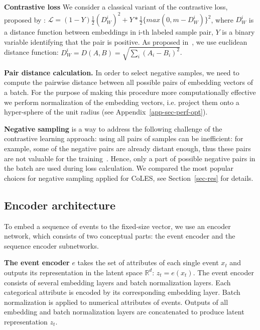 \documentclass[sigconf]{acmart}
\newcommand{\R}{\mathbb{R}}
\begin{document}
\textbf{Contrastive loss} We consider a classical variant of the contrastive loss, proposed by \citep{Hadsell2006DimensionalityRB}: %
$ \mathcal{L} =  (1-Y)\frac{1}{2}(D_W^i)^2 +Y*\frac{1}{2}\{max(0,m-D_W^i)\}^2 $, where $D_W^i$ is a distance function between embeddings in i-th labeled sample pair, $Y$ is a binary variable identifying that the pair is positive.
As proposed in~\citep{Hadsell2006DimensionalityRB}, we use euclidean distance function: $D_W^i = D(A,B) = \sqrt{\sum_i(A_i - B_i)^2}$.

\textbf{Pair distance calculation.} In order to select negative samples, we need to compute the pairwise distance between all possible pairs of embedding vectors of a batch. For the purpose of making this procedure more computationally effective we perform normalization of the embedding vectors, i.e. project them onto a hyper-sphere of the unit radius (see Appendix~\ref{app-sec-perf-opt}).


\textbf{Negative sampling} is a way to address the following challenge of the contrastive learning approach: using all pairs of samples can be inefficient: for example, some of the negative pairs are already distant enough, thus these pairs are not valuable for the training~\citep{SimoSerra2015DiscriminativeLO, Schroff2015FaceNetAU}. Hence, only a part of possible negative pairs in the batch are used during loss calculation. We compared the most popular choices for negative sampling applied for CoLES, see Section~\ref{sec-res} for details.

\subsection{Encoder architecture} \label{sec-enc-arch}

To embed a sequence of events to the fixed-size vector, we use an encoder network, which consists of two conceptual parts: the event encoder and the sequence encoder subnetworks.

\textbf{The event encoder} $e$ takes the set of attributes of each single event $x_t$ and outputs its representation in the latent space $\R^d$: $z_t = e(x_t)$. The event encoder consists of several embedding layers and batch normalization layers. Each categorical attribute is encoded by its corresponding embedding layer. Batch normalization is applied to numerical attributes of events. Outputs of all embedding and batch normalization layers are concatenated to produce latent representation $z_t$.
\end{document}
